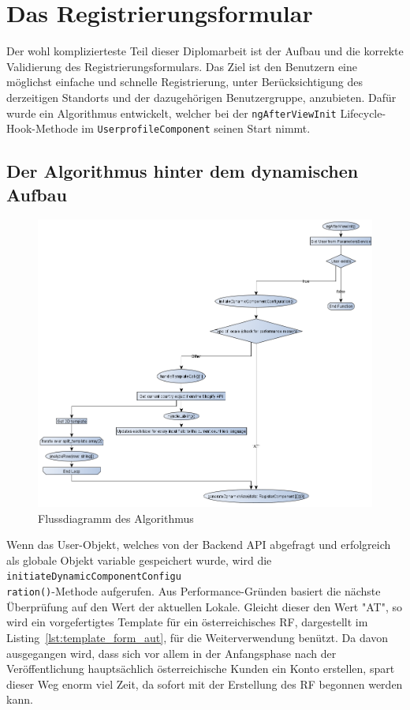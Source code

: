 \chapter{Das Registrierungsformular}

Der wohl komplizierteste Teil dieser Diplomarbeit ist der Aufbau und die korrekte Validierung des Registrierungsformulars. Das Ziel ist den Benutzern eine möglichst einfache und schnelle Registrierung, unter Berücksichtigung des derzeitigen Standorts und der dazugehörigen Benutzergruppe, anzubieten. Dafür wurde ein Algorithmus entwickelt, welcher bei der \texttt{ngAfterViewInit} Lifecycle-Hook-Methode im \texttt{UserprofileComponent} seinen Start nimmt.

\section{Der Algorithmus hinter dem dynamischen Aufbau}

\begin{figure}[H]
	\centerline{
		\includegraphics[width=1\textwidth, frame]{./grafiken/RF_Flussdiagramm.png}
	}
	\vskip0pt
	\caption{Flussdiagramm des Algorithmus}
	\label{fig:fc}
\end{figure}

Wenn das User-Objekt, welches von der Backend API abgefragt und erfolgreich als globale Objekt variable gespeichert wurde, wird die \texttt{initiateDynamicComponentConfigu\\ration()}-Methode aufgerufen. Aus Performance-Gründen basiert die nächste Überprüfung auf den Wert der aktuellen Lokale. Gleicht dieser den Wert "AT", so wird ein vorgefertigtes Template für ein österreichisches RF, dargestellt im Listing~\ref{lst:template_form_aut}, für die Weiterverwendung benützt. Da davon ausgegangen wird, dass sich vor allem in der Anfangsphase nach der Veröffentlichung hauptsächlich österreichische Kunden ein Konto erstellen, spart dieser Weg enorm viel Zeit, da sofort mit der Erstellung des RF begonnen werden kann.

